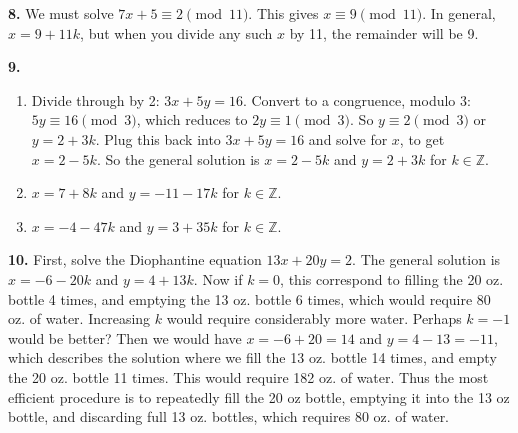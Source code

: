 \documentclass[10pt,]{book}
\theoremstyle{plain}
\theoremstyle{definition}
\theoremstyle{definition}
\theoremstyle{definition}
\numberwithin{equation}{chapter}
\def\Z{\mathbb Z}
\begin{document}
\par\smallskip
\noindent\textbf{8.}\quad{}
We must solve \(7x + 5 \equiv 2 \pmod{11}\). This gives \(x \equiv 9 \pmod{11}\). In general, \(x = 9 + 11k\), but when you divide any such \(x\) by 11, the remainder will be 9.
%
\par\smallskip
\noindent\textbf{9.}\quad{}\leavevmode%
\begin{enumerate}[label=(\alph*)]
\item\hypertarget{li-1440}{}
Divide through by 2: \(3x + 5y = 16\).  Convert to a congruence, modulo 3: \(5y \equiv 16 \pmod 3\), which reduces to \(2y \equiv 1 \pmod 3\).  So \(y \equiv 2 \pmod 3\) or \(y = 2 + 3k\).  Plug this back into \(3x + 5y = 16\) and solve for \(x\), to get \(x = 2-5k\).  So the general solution is \(x = 2-5k\) and \(y = 2+3k\) for \(k \in \Z\).
%
\item\hypertarget{li-1441}{}\(x = 7+8k\) and \(y = -11 - 17k\) for \(k \in \Z\).%
\item\hypertarget{li-1442}{}\(x = -4-47k\) and \(y = 3 + 35k\) for \(k \in \Z\).%
\end{enumerate}
\par\smallskip
\noindent\textbf{10.}\quad{}
First, solve the Diophantine equation \(13x + 20 y = 2\). The general solution is \(x = -6 - 20k\) and \(y = 4+13k\). Now if \(k = 0\), this correspond to filling the 20 oz. bottle 4 times, and emptying the 13 oz. bottle 6 times, which would require 80 oz. of water. Increasing \(k\) would require considerably more water. Perhaps \(k = -1\) would be better? Then we would have \(x = -6+20 = 14\) and \(y = 4-13 = -11\), which describes the solution where we fill the 13 oz. bottle 14 times, and empty the 20 oz. bottle 11 times. This would require 182 oz. of water. Thus the most efficient procedure is to repeatedly fill the 20 oz bottle, emptying it into the 13 oz bottle, and discarding full 13 oz. bottles, which requires 80 oz. of water.
%
\par\smallskip
\typeout{************************************************}
\typeout{************************************************}
\end{document}
